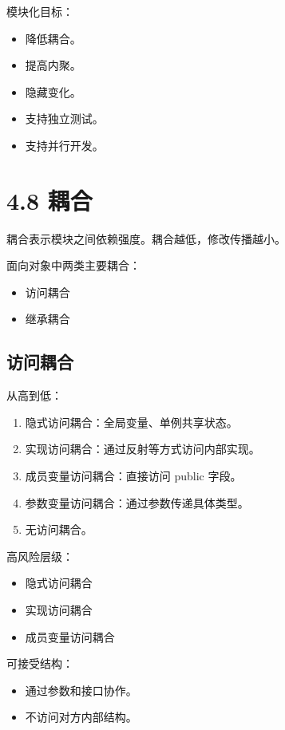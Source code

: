 \documentclass[UTF8,zihao=-4]{ctexart}
\begin{document}
模块化目标：

\begin{itemize}
\item 降低耦合。
\item 提高内聚。
\item 隐藏变化。
\item 支持独立测试。
\item 支持并行开发。
\end{itemize}

\section{4.8 耦合}

耦合表示模块之间依赖强度。耦合越低，修改传播越小。

面向对象中两类主要耦合：

\begin{itemize}
\item 访问耦合
\item 继承耦合
\end{itemize}

\subsection{访问耦合}

从高到低：

\begin{enumerate}
\item 隐式访问耦合：全局变量、单例共享状态。
\item 实现访问耦合：通过反射等方式访问内部实现。
\item 成员变量访问耦合：直接访问 public 字段。
\item 参数变量访问耦合：通过参数传递具体类型。
\item 无访问耦合。
\end{enumerate}

高风险层级：

\begin{itemize}
\item 隐式访问耦合
\item 实现访问耦合
\item 成员变量访问耦合
\end{itemize}

可接受结构：

\begin{itemize}
\item 通过参数和接口协作。
\item 不访问对方内部结构。
\end{itemize}
\end{document}
